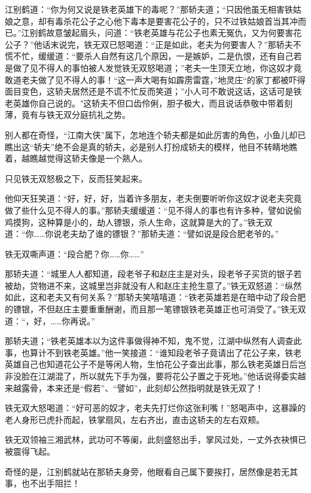 \documentclass[12pt,oneside]{book}
\begin{document}
江别鹤道：``你为何又说是铁老英雄下的毒呢？''那轿夫道；``只因他虽无相害铁姑娘之意，却有毒杀花公子之心他下毒本是要害花公子的，只不过铁姑娘首当其冲而已。''江别鹤故意皱起眉头，问道：``铁老英雄与花公子也素无冤仇，又为何要害花公子？''他话末说完，铁无双已怒喝道：``正是如此，老夫为何要害人？''那轿夫不慌不忙，缓缓道：``要杀人自然有这几个原因，一是嫉妒，二是仇恨，还有自己若是做了见不得人的事怕被人发觉铁无双怒喝道；''老夫一生顶天立地，你这奴才竟敢道老夫做了见不得人的事！``这一声大喝有如霹雳雷霆，''地灵庄``的家丁都被吓得面目变色，这轿夫居然还是不谎不忙反而笑道；''小人可不敢说这话，这话可是铁老英雄你自己说的。"这轿夫不但口齿伶俐，胆子极大，而且说话恭敬中带着刻薄，竟有与铁无双分庭抗礼之势。

别人都在奇怪，``江南大侠''属下，怎地连个轿夫都是如此厉害的角色，小鱼儿却已瞧出这``轿夫''绝不会是真的轿夫，必是别人打扮成轿夫的模样，他目不转睛地瞧着，越瞧越觉得这轿夫像是一个熟人。

只见铁无双怒极之下，反而狂笑起来。

他仰天狂笑道：``好，好，好，当着许多朋友，老夫倒要听听你这奴才说老夫究竟做了些什么见不得人的事。''那轿夫缓缓道：``见不得人的事也有许多种，譬如说偷鸡摸狗，这种算是小的，劫人镖银，杀人生命，这就算是大的了。''铁无双道：``你\ldots\ldots 你说老夫劫了谁的镖银？''那轿夫道：``譬如说是段合肥老爷的。''

铁无双嘶声道：``段合肥？你\ldots\ldots 你\ldots\ldots{}''

那轿夫道：``城里人人都知道，段老爷子和赵庄主是对头，段老爷子买货的银子若被劫，贷物进不来，这城里岂非就没有人和赵庄主抢生意了。''铁无双怒道：``纵然如此，这和老夫又有何关系？''那轿夫笑嘻嘻道：``铁老英雄若是在暗中动了段合肥的镖银，不但赵庄主要重重酬谢，而且那一笔镖银铁老英雄正也可消受了。''铁无双道：``，好，\ldots\ldots 你再说。''

那轿夫道；``铁老英雄本以为这件事做得神不知，鬼不觉，江湖中纵然有人调查此事，也算计不到铁老英雄。''他一笑接道：``谁知段老爷子竟请出了花公子来，铁老英雄自己也知道花公子不是等闲人物，生怕花公子查出此事，那么铁老英雄日后岂非没脸在江湖混了，所以就先下手为强，要将花公子置之于死地。''他话说得委实越来越露骨，本来还是``假若''、``譬如''，此刻却公然指明就是铁无双了！

铁无双大怒喝道：``好可恶的奴才，老夫先打烂你这张利嘴！''怒喝声中，这暴躁的老人身形已虎扑而起，铁掌扇风，左右齐出，直击这轿夫的左右双颊。

铁无双领袖三湘武林，武功可不等阑，此刻盛怒出手，掌风过处，一丈外衣袂惧已被震得飞起。

奇怪的是，江别鹤就站在那轿夫身旁，他眼看自己属下要挨打，居然像是若无其事，也不出手阻拦！
\end{document}
